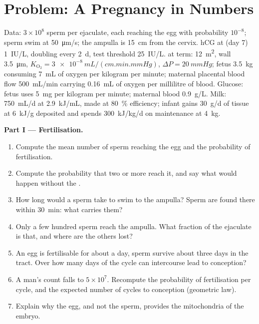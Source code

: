 \section{Problem: A Pregnancy in Numbers}

\begin{problem}
\label{pb:b2:mammal-reproduction:1}
Data: $3\times 10^{8}$ sperm per ejaculate, each reaching the egg
with probability $10^{-8}$; sperm swim at \qty{50}{\micro m/s}; the
ampulla is \qty{15}{cm} from the cervix. hCG at  (day 7)
\qty{1}{IU/L}, doubling every \qty{2}{d}, test threshold
\qty{25}{IU/L}.  at term: \qty{12}{m^2}, wall
\qty{3.5}{\micro m}, $K_{\mathrm{O_2}} = \qty{3e-8}{mL/(cm.min.mmHg)}$,
$\Delta P = \qty{20}{mmHg}$; fetus \qty{3.5}{kg} consuming
\qty{7}{mL} of oxygen per kilogram per minute; maternal placental
blood flow \qty{500}{mL/min} carrying \qty{0.16}{mL} of oxygen per
millilitre of blood. Glucose: fetus uses \qty{5}{mg} per kilogram per
minute; maternal blood \qty{0.9}{g/L}. Milk: \qty{750}{mL/d} at
\qty{2.9}{kJ/mL}, made at \qty{80}{\%} efficiency; infant gains
\qty{30}{g/d} of tissue at \qty{6}{kJ/g} deposited and spends
\qty{300}{kJ/kg/d} on maintenance at \qty{4}{kg}.

\medskip
\noindent\textbf{Part I --- Fertilisation.}
\begin{enumerate}
  \item Compute the mean number of sperm reaching the egg and the
        probability of fertilisation.
  \item Compute the probability that two or more reach it, and say
        what would happen without the .
  \item How long would a sperm take to swim to the ampulla? Sperm
        are found there within \qty{30}{min}: what carries them?
  \item Only a few hundred sperm reach the ampulla. What fraction of
        the ejaculate is that, and where are the others lost?
  \item An egg is fertilisable for about a day, sperm survive about
        three days in the tract. Over how many days of the cycle can
        intercourse lead to conception?
  \item A man's count falls to $5\times 10^{7}$. Recompute the
        probability of fertilisation per cycle, and the expected
        number of cycles to conception (geometric law).
  \item Explain why the egg, and not the sperm, provides the
        mitochondria of the embryo.
\end{enumerate}


\end{problem}
